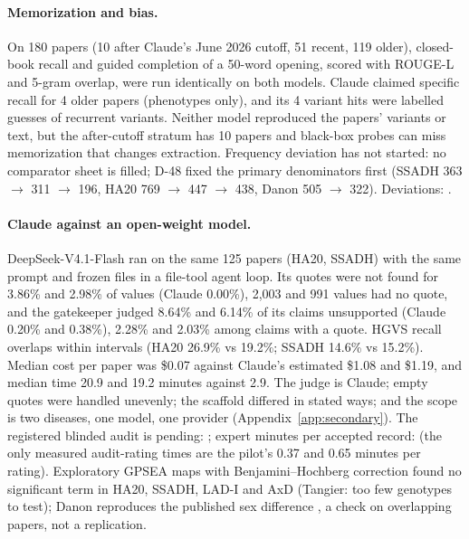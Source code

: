 \documentclass{article} %
\begin{document}
\paragraph{Memorization and bias.} On 180 papers (10 after Claude's June 2026 cutoff, 51 recent, 119 older), closed-book recall and guided completion of a 50-word opening, scored with ROUGE-L \citep{Lin2002ManualAutomatic} and 5-gram overlap, were run identically on both models. Claude claimed specific recall for 4 older papers (phenotypes only), and its 4 variant hits were labelled guesses of recurrent variants. Neither model reproduced the papers' variants or text, but the after-cutoff stratum has 10 papers and black-box probes can miss memorization that changes extraction. Frequency deviation has not started: no comparator sheet is filled; D-48 fixed the primary denominators first (SSADH 363 $\rightarrow$ 311 $\rightarrow$ 196, HA20 769 $\rightarrow$ 447 $\rightarrow$ 438, Danon 505 $\rightarrow$ 322). Deviations: .

\paragraph{Claude against an open-weight model.} DeepSeek-V4.1-Flash \citep{Deepseekai2026Deepseekv4Towards} ran on the same 125 papers (HA20, SSADH) with the same prompt and frozen files in a file-tool agent loop. Its quotes were not found for 3.86\% and 2.98\% of values (Claude 0.00\%), 2,003 and 991 values had no quote, and the gatekeeper judged 8.64\% and 6.14\% of its claims unsupported (Claude 0.20\% and 0.38\%), 2.28\% and 2.03\% among claims with a quote. HGVS recall overlaps within intervals (HA20 26.9\% vs 19.2\%; SSADH 14.6\% vs 15.2\%). Median cost per paper was \$0.07 against Claude's estimated \$1.08 and \$1.19, and median time 20.9 and 19.2 minutes against 2.9. The judge is Claude; empty quotes were handled unevenly; the scaffold differed in stated ways; and the scope is two diseases, one model, one provider (Appendix~\ref{app:secondary}). The registered blinded audit is pending: ; expert minutes per accepted record:  (the only measured audit-rating times are the pilot's 0.37 and 0.65 minutes per rating). Exploratory GPSEA maps \citep{rekerle2026_gpsea} with Benjamini--Hochberg correction \citep{Benjamini1995ControllingFalse} found no significant term in HA20, SSADH, LAD-I and AxD (Tangier: too few genotypes to test); Danon reproduces the published sex difference \citep{boucek2011_danon_natural_history}, a check on overlapping papers, not a replication.
\end{document}
